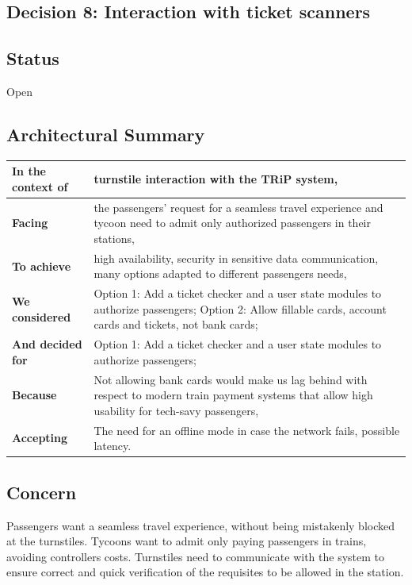\subsection{Decision 8: Interaction with ticket scanners}

\subsection*{Status}
Open
\subsection*{Architectural Summary}
\begin{tabular}{|p{3.5cm}|p{10.5cm}|}
    \hline
    \textbf{In the context of} & turnstile interaction with the TRiP system, \\
    \hline
    \textbf{Facing} & the passengers' request for a seamless travel experience and tycoon need to admit only authorized passengers in their stations, \\
    \hline
    \textbf{To achieve} & high availability, security in sensitive data communication, many options adapted to different passengers needs, \\
    \hline
    \textbf{We considered} & Option 1: Add a ticket checker and a user state modules to authorize passengers; Option 2: Allow fillable cards, account cards and tickets, not bank cards;\\
    \hline
    \textbf{And decided for} & Option 1: Add a ticket checker and a user state modules to authorize passengers;\\
    \hline
    \textbf{Because} & Not allowing bank cards would make us lag behind with respect to modern train payment systems that allow high usability for tech-savy passengers, \\
    \hline
    \textbf{Accepting} & The need for an offline mode in case the network fails, possible latency. \\
    \hline
\end{tabular}
\subsection*{Concern}
Passengers want a seamless travel experience, without being mistakenly blocked at the turnstiles.
Tycoons want to admit only paying passengers in trains, avoiding controllers costs.
Turnstiles need to communicate with the system to ensure correct and quick verification of the requisites to be allowed in the station.

